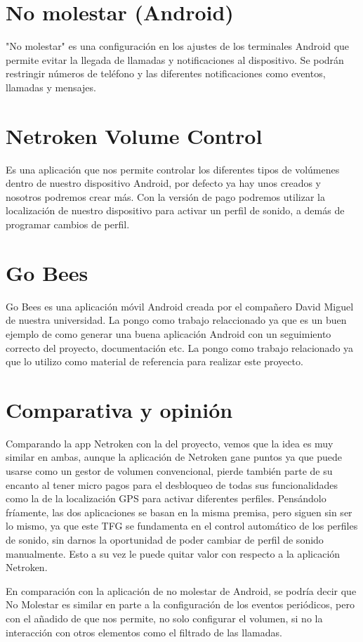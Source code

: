 
\section{No molestar (Android)}
"No molestar" es una configuración en los ajustes de los terminales Android que permite evitar la llegada de llamadas y notificaciones al dispositivo. Se podrán restringir números de teléfono y las diferentes notificaciones como eventos, llamadas y mensajes.\cite{nomolestar}

\section{Netroken Volume Control}
Es una aplicación que nos permite controlar los diferentes tipos de volúmenes dentro de nuestro dispositivo Android, por defecto ya hay unos creados y nosotros podremos crear más. Con la versión de pago podremos utilizar la localización de nuestro dispositivo para activar un perfil de sonido, a demás de programar cambios de perfil.\cite{netroken}

\section{Go Bees}
Go Bees es una aplicación móvil Android creada por el compañero David Miguel de nuestra universidad.
La pongo como trabajo relaccionado ya que es un buen ejemplo de como generar una buena aplicación Android con un seguimiento correcto del proyecto, documentación etc. La pongo como trabajo relacionado ya que lo utilizo como material de referencia para realizar este proyecto.\cite{gobees}

\section{Comparativa y opinión}
Comparando la app Netroken con la del proyecto, vemos que la idea es muy similar en ambas, aunque la aplicación de Netroken gane puntos ya que puede usarse como un gestor de volumen convencional, pierde también parte de su encanto al tener micro pagos para el desbloqueo de todas sus funcionalidades como la de la localización GPS para activar diferentes perfiles.
Pensándolo fríamente, las dos aplicaciones se basan en la misma premisa, pero siguen sin ser lo mismo, ya que este TFG se fundamenta en el control automático de los perfiles de sonido, sin darnos la oportunidad de poder cambiar de perfil de sonido manualmente. Esto a su vez le puede quitar valor con respecto a la aplicación Netroken.

En comparación con la aplicación de no molestar de Android, se podría decir que No Molestar es similar en parte a la configuración de los eventos periódicos, pero con el añadido de que nos permite, no solo configurar el volumen, si no la interacción con otros elementos como el filtrado de las llamadas.